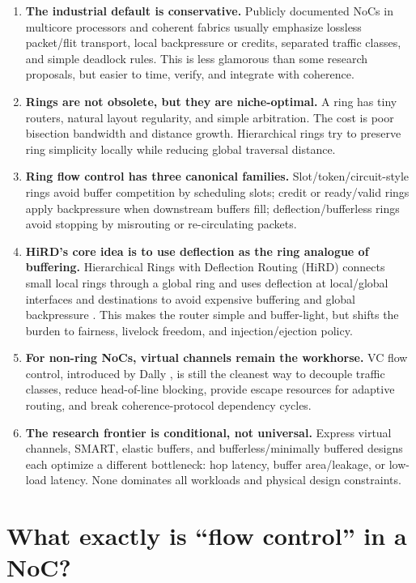 \documentclass[11pt]{article}
\newcommand{\term}[1]{\textbf{#1}}
\begin{document}
\begin{enumerate}
  \item \term{The industrial default is conservative.} Publicly documented NoCs in multicore processors and coherent fabrics usually emphasize lossless packet/flit transport, local backpressure or credits, separated traffic classes, and simple deadlock rules. This is less glamorous than some research proposals, but easier to time, verify, and integrate with coherence.
  \item \term{Rings are not obsolete, but they are niche-optimal.} A ring has tiny routers, natural layout regularity, and simple arbitration. The cost is poor bisection bandwidth and distance growth. Hierarchical rings try to preserve ring simplicity locally while reducing global traversal distance.
  \item \term{Ring flow control has three canonical families.} Slot/token/circuit-style rings avoid buffer competition by scheduling slots; credit or ready/valid rings apply backpressure when downstream buffers fill; deflection/bufferless rings avoid stopping by misrouting or re-circulating packets.
  \item \term{HiRD's core idea is to use deflection as the ring analogue of buffering.} Hierarchical Rings with Deflection Routing (HiRD) connects small local rings through a global ring and uses deflection at local/global interfaces and destinations to avoid expensive buffering and global backpressure \cite{Ausavarungnirun2014HiRD}. This makes the router simple and buffer-light, but shifts the burden to fairness, livelock freedom, and injection/ejection policy.
  \item \term{For non-ring NoCs, virtual channels remain the workhorse.} VC flow control, introduced by Dally \cite{Dally1990VC,Dally1992VC}, is still the cleanest way to decouple traffic classes, reduce head-of-line blocking, provide escape resources for adaptive routing, and break coherence-protocol dependency cycles.
  \item \term{The research frontier is conditional, not universal.} Express virtual channels, SMART, elastic buffers, and bufferless/minimally buffered designs each optimize a different bottleneck: hop latency, buffer area/leakage, or low-load latency. None dominates all workloads and physical design constraints.
\end{enumerate}

\section{What exactly is ``flow control'' in a NoC?}
\end{document}
